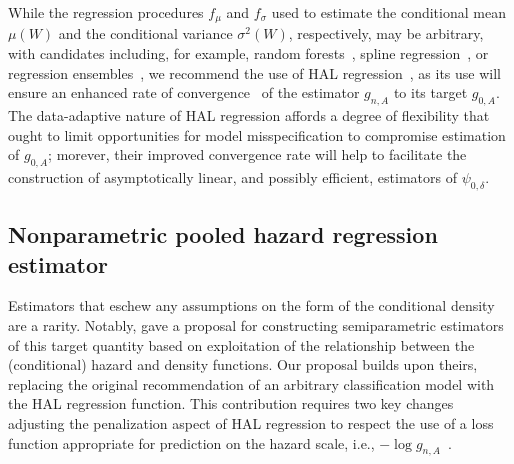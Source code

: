 While the regression procedures $f_{\mu}$ and $f_{\sigma}$ used to estimate the
conditional mean $\mu(W)$ and the conditional variance $\sigma^2(W)$,
respectively, may be arbitrary, with candidates including, for example, random
forests~\citep{breiman2001random}, spline regression~\citep{stone1994use,
friedman1991multivariate}, or regression ensembles~\citep{wolpert1992stacked,
breiman1996stacked,vdl2007super}, we recommend the use of HAL
regression~\citep{benkeser2016highly,vdl2017generally}, as its use will ensure
an enhanced rate of convergence~\citep{bibaut2019fast} of the estimator
$g_{n,A}$ to its target $g_{0,A}$. The data-adaptive nature of HAL regression
affords a degree of flexibility that ought to limit opportunities for model
misspecification to compromise estimation of $g_{0,A}$; morever, their improved
convergence rate will help to facilitate the construction of asymptotically
linear, and possibly efficient, estimators of $\psi_{0, \delta}$.

\subsection{Nonparametric pooled hazard regression
estimator}\label{pooled_haz_est}

Estimators that eschew any assumptions on the form of the conditional density
are a rarity. Notably, \citet{diaz2011super} gave a proposal for constructing
semiparametric estimators of this target quantity based on exploitation of the
relationship between the (conditional) hazard and density functions. Our
proposal builds upon theirs, replacing the original recommendation of an
arbitrary classification model with the HAL regression function. This
contribution requires two key changes adjusting the penalization aspect of HAL
regression to respect the use of a loss function appropriate for prediction on
the hazard scale, i.e., $-\log g_{n,A}$~\citep{dudoit2005asymptotics}.


